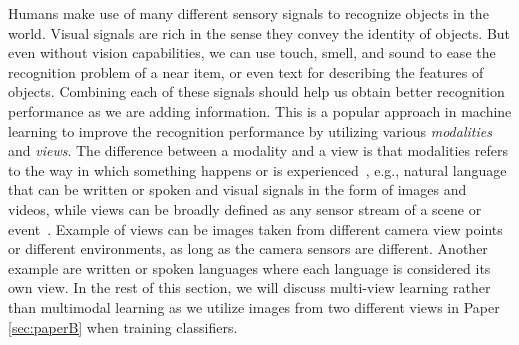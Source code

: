 Humans make use of many different sensory signals to recognize objects in the world. Visual signals are rich in the sense they convey the identity of objects. But even without vision capabilities, we can use touch, smell, and sound to ease the recognition problem of a near item, or even text for describing the features of objects. Combining each of these signals should help us obtain better recognition performance as we are adding information. This is a popular approach in machine learning to improve the recognition performance by utilizing various \textit{modalities} and \textit{views}. The difference between a modality and a view is that modalities refers to the way in which something happens or is experienced~\cite{baltruvsaitis2018multimodal}, e.g., natural language that can be written or spoken and visual signals in the form of images and videos, while views can be broadly defined as any sensor stream of a scene or event~\cite{salzmann2010factorized}. Example of views can be images taken from different camera view points or different environments, as long as the camera sensors are different. Another example are written or spoken languages where each language is considered its own view. In the rest of this section, we will discuss multi-view learning rather than multimodal learning as we utilize images from two different views in Paper \ref{sec:paperB} when training classifiers. 





